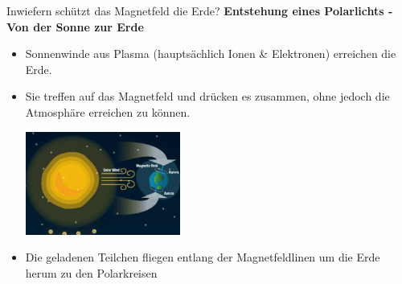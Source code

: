 \documentclass[10pt]{beamer}
\begin{document}
\begin{frame}{Inwiefern schützt das Magnetfeld die Erde?}
\textbf{Entstehung eines Polarlichts - Von der Sonne zur Erde}\pause
\begin{itemize}
    \item Sonnenwinde aus Plasma (hauptsächlich Ionen \& Elektronen) erreichen die Erde. \pause
    \item Sie treffen auf das Magnetfeld und drücken es zusammen, ohne jedoch die Atmosphäre erreichen zu können.\pause
    \begin{center}
        \includegraphics[width=0.4\textwidth]{nordlichter004-590.jpg}\pause
    \end{center}
\item Die geladenen Teilchen fliegen entlang der Magnetfeldlinen um die Erde herum zu den Polarkreisen 
\end{itemize}

\end{frame}
\end{document}

